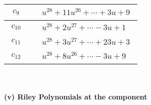 \documentclass[1p]{elsarticle_modified}
\theoremstyle{definition}
\begin{document}
\begin{tabular}{m{50pt}|m{274pt}}
\hline $$\begin{aligned}c_{9}\end{aligned}$$&$\begin{aligned}
&u^{28}+11 u^{26}+\cdots+3 u+9
\end{aligned}$\\
\hline $$\begin{aligned}c_{10}\end{aligned}$$&$\begin{aligned}
&u^{28}+2 u^{27}+\cdots-3 u+1
\end{aligned}$\\
\hline $$\begin{aligned}c_{11}\end{aligned}$$&$\begin{aligned}
&u^{28}+3 u^{27}+\cdots+23 u+3
\end{aligned}$\\
\hline $$\begin{aligned}c_{12}\end{aligned}$$&$\begin{aligned}
&u^{28}+8 u^{26}+\cdots-3 u+9
\end{aligned}$\\
\hline
\end{tabular}\\~\\
\newpage\renewcommand{\arraystretch}{1}
\flushleft \textbf{(v) Riley Polynomials at the component}\newline \\
\end{document}
